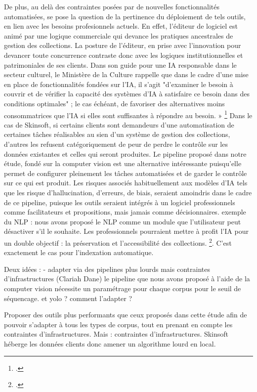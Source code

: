 De plus, au delà des contraintes posées par de nouvelles fonctionnalités automatisées, se pose la question de la pertinence du déploiement de tels outils, en lien avec les besoins profesionnels actuels. En effet, l'éditeur de logiciel est animé par une logique commerciale qui devance les pratiques ancestrales de gestion des collections. La posture de l'éditeur, en prise avec l'innovation pour devancer toute concurrence contraste donc avec les logiques institutionnelles et patrimoniales de ses clients. Dans son guide pour une IA responsable dans le secteur culturel, le Ministère de la Culture rappelle que dans le cadre d'une mise en place de fonctionnalités fondées sur l'IA, il s'agit "d’examiner le besoin à couvrir et de vérifier la capacité des systèmes d’IA à satisfaire ce besoin dans des conditions optimales" ; le cas échéant, de favoriser des alternatives moins consommatrices que l’IA si elles sont suffisantes à répondre au besoin. » \footcite{2025a}
Dans le cas de Skinsoft, si certains clients sont demandeurs d'une automatisation de certaines tâches réalisables au sien d'un système de gestion des collections, d'autres les refusent catégoriquement de peur de perdre le contrôle sur les données existantes et celles qui seront produites. Le pipeline proposé dans notre étude, fondé sur la computer vision est une alternative intéressante puisqu'elle permet de configurer pleinement les tâches automatisées et de garder le contrôle sur ce qui est produit. Les risques associés habituellement aux modèles d'IA tels que les risque d'hallucination, d'erreurs, de biais, seraient amoindris dans le cadre de ce pipeline, puisque les outils seraient intégrés à un logiciel professionnels comme facilitateurs et propositions, mais jamais comme décisionnaires. 
exemple du NLP : nous avons proposé le NLP comme un module que l'utilisateur peut désactiver s'il le souhaite. 
Les professionnels pourraient mettre à profit l'IA pour un double objectif : la préservation et l'accessibilité des collections. \footcite{zotero-item-640}. C'est exactement le cas pour l'indexation automatique.



Deux idées : 
- adapter via des pipelines plus lourds mais contraintes d'infrastructures (Clariah Dane) le pipeline que nous avons proposé à l'aide de la computer vision nécessite un paramétrage pour chaque corpus pour le seuil de séquencage. et yolo ? comment l'adapter ? 


Proposer des outils plus performants que ceux proposés dans cette étude afin de pouvoir s’adapter à tous les types de corpus, tout en prenant en compte les contraintes d’infrastructures. Mais : contraintes d’infrastructures. Skinsoft héberge les données clients donc amener un algorithme lourd en local.  

